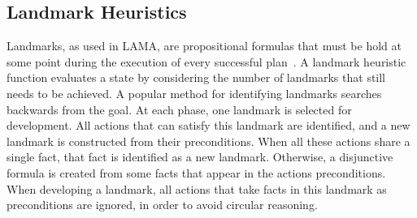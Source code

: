 \documentclass[letterpaper]{article}
\theoremstyle{definition}
\begin{document}


\subsection{Landmark Heuristics}
Landmarks, as used in LAMA, %
are propositional formulas that must be hold at some point during the execution of every successful plan~\citep{richter2008landmarks}. A landmark heuristic function evaluates a state by considering the number of landmarks that still needs to be achieved. A popular method for identifying landmarks searches backwards from the goal. At each phase, one landmark is selected for development. All actions that can satisfy this landmark are identified, and a new landmark is constructed from their preconditions. When all these actions share a single fact, that fact is identified as a new landmark. Otherwise, a disjunctive formula is created from some facts that appear in the actions preconditions. When developing a landmark, all actions that take facts in this landmark as preconditions are ignored, in order to avoid circular reasoning.
\end{document}
